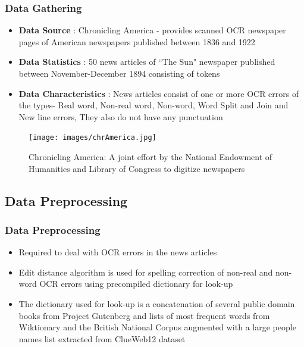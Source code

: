 \documentclass{beamer}
\begin{document}
\begin{frame}

\frametitle{Data Gathering}
\begin{itemize}
 \justifying

\item \textbf{Data Source} : Chronicling America - provides scanned OCR newspaper pages of American newspapers published between 1836 and 1922 
\item \textbf{Data Statistics} : 50 news articles of ``The Sun" newspaper published between November-December 1894 consisting of  tokens
\item \textbf{Data Characteristics} : News articles consist of one or more OCR errors of the types- Real word, Non-real word, Non-word, Word Split and Join and New line errors, They also do not have any punctuation
\end{itemize}
\begin{figure}[ht]
\begin{center}
\texttt{[image: images/chrAmerica.jpg]}
\caption{Chronicling America: A joint effort by the National Endowment of Humanities and Library of Congress to digitize newspapers}
\end{center}
\end{figure}


\end{frame} 

\subsection{Data Preprocessing}

\begin{frame}
\frametitle{Data Preprocessing}
\begin{itemize}
 \justifying

\item
Required to deal with OCR errors in the news articles
\item
Edit distance algorithm is used for spelling correction of non-real and non-word OCR errors using precompiled dictionary for look-up
\item
The dictionary used for look-up is a concatenation of several public domain books from Project Gutenberg and lists of most
frequent words from Wiktionary and the British National Corpus augmented with a large people names list extracted from ClueWeb12 dataset
\end{itemize}
\end{frame}
\end{document}
